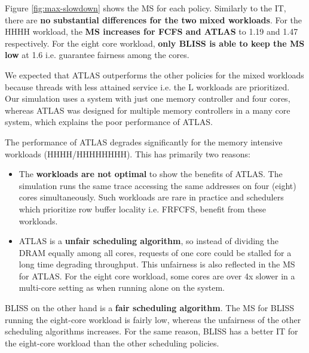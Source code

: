 \documentclass[a4paper]{article}
\newcommand{\wl}[1]{\textsf{\small #1}}
\begin{document}
Figure \ref{fig:max-slowdown} shows the MS for each policy. Similarly to the IT,
there are \textbf{no substantial differences for the two mixed workloads}. For
the \wl{HHHH} workload, the \textbf{MS increases for FCFS and ATLAS} to 1.19 and
1.47 respectively. For the eight core workload, \textbf{only BLISS is able to
keep the MS low} at 1.6 i.e.  guarantee fairness among the cores.

We expected that ATLAS outperforms the other policies for the mixed workloads
because threads with less attained service i.e. the \wl{L} workloads are
prioritized. Our simulation uses a system with just one memory controller and
four cores, whereas ATLAS was designed for multiple memory controllers in a many
core system, which explains the poor performance of ATLAS.

\newpage

The performance of ATLAS degrades significantly for the memory intensive
workloads (\wl{HHHH/HHHHHHHH}). This has primarily two reasons:
\begin{itemize}
    \item The \textbf{workloads are not optimal} to show the
        benefits of ATLAS. The simulation runs the same trace accessing the
        same addresses on four (eight) cores simultaneously. Such workloads
        are rare in practice and schedulers which prioritize row buffer
        locality i.e. FRFCFS, benefit from these workloads.

    \item ATLAS is a \textbf{unfair scheduling algorithm}, so instead of dividing
        the DRAM equally among all cores, requests of one core could be stalled for
        a long time degrading throughput.  This unfairness is also reflected in
        the MS for ATLAS. For the eight core workload, some cores are over 4x
        slower in a multi-core setting as when running alone on the system.
\end{itemize}

BLISS on the other hand is a \textbf{fair scheduling algorithm}. The MS for
BLISS running the eight-core workload is fairly low, whereas the unfairness of
the other scheduling algorithms increases. For the same reason, BLISS has
a better IT for the eight-core workload than the other scheduling policies.
\end{document}

